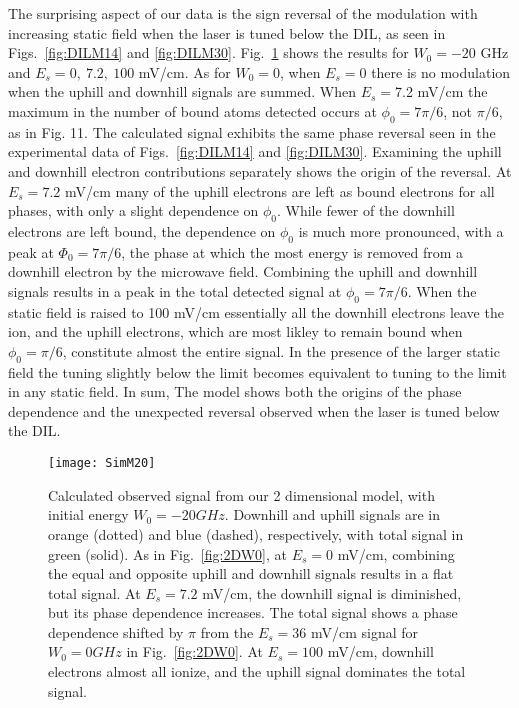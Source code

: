 \documentclass[aps,pra,preprint,groupedaddress]{revtex4-1}
\begin{document}
The  surprising aspect of our data is the sign reversal of the modulation with increasing static field when the laser is tuned below the DIL, as seen in Figs.~\ref{fig:DILM14} and \ref{fig:DILM30}. Fig.~\ref{fig:2DW20} shows the results for $W_0 = -20$ GHz and $E_s = 0, ~7.2, ~100$ mV/cm. As for $W_0=0$, when $E_s=0$ there is no modulation when the uphill and downhill signals are summed. When $E_s=$7.2 mV/cm the maximum in the number of bound atoms detected occurs at $\phi_0=7\pi/6$, not $\pi/6$, as in Fig. 11. The calculated signal exhibits the same phase reversal seen in the experimental data of Figs.~\ref{fig:DILM14} and \ref{fig:DILM30}. Examining the uphill and downhill electron contributions separately shows the origin of the reversal. At $E_s = 7.2$ mV/cm many of the uphill electrons are left as bound electrons for all phases, with only a slight dependence on $\phi_0$. While fewer of the downhill electrons are left bound, the dependence on $\phi_0$ is much more pronounced, with a peak at $\Phi_0=7\pi/6$, the phase at which the most energy is removed from a downhill electron by the microwave field. Combining the uphill and downhill signals results in a peak in the total detected signal at $\phi_0=7\pi/6$. When the static field is raised to 100 mV/cm essentially all the downhill electrons leave the ion, and the uphill electrons, which are most likley to remain bound when $\phi_0=\pi/6$, constitute almost the entire signal. In the presence of the larger static field the tuning slightly below the limit becomes equivalent to tuning to the limit in any static field. In sum, The model shows both the origins of the phase dependence and the unexpected reversal observed when the laser is tuned below the DIL.


\begin{figure}
	\texttt{[image: SimM20]}
	\caption{Calculated observed signal from our 2 dimensional model, with initial energy $W_0 = -20 GHz$. Downhill and uphill signals are in orange (dotted) and blue (dashed), respectively, with total signal in green (solid). As in Fig.~\ref{fig:2DW0}, at $E_s = 0$ mV/cm, combining the equal and opposite uphill and downhill signals results in a flat total signal. At $E_s = 7.2$ mV/cm, the downhill signal is diminished, but its phase dependence increases. The total signal shows a phase dependence shifted by $\pi$ from the $E_s=36$ mV/cm signal for $W_0 = 0 GHz$ in Fig.~\ref{fig:2DW0}. At $E_s = 100$ mV/cm, downhill electrons almost all ionize, and the uphill signal dominates the total signal.}
	\label{fig:2DW20}
\end{figure}
\end{document}
